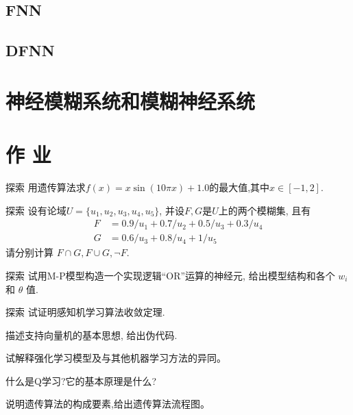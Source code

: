 {\subsection{FNN}
\subsection{DFNN}
\section{神经模糊系统和模糊神经系统}

\section{作      业}
\begin{custom}[explorecolor]{探索}
用遗传算法求$f(x)=x\sin(10πx)+1.0$的最大值,其中$x\in [-1,2]$.
\end{custom}
\begin{custom}[explorecolor]{探索}
设有论域$U=\{u_1, u_2, u_3, u_4, u_5\}$, 并设$F,G$是$U$上的两个模糊集, 且有
\begin{align*}
  F&=0.9/u_1+0.7/u_2+0.5/u_3+0.3/u_4\\
  G&=0.6/u_3+0.8/u_4+1/u_5
\end{align*}
请分别计算 $F\cap G, F\cup G,\neg F$.
\end{custom}
\begin{custom}[explorecolor]{探索}
试用M-P模型构造一个实现逻辑``OR''运算的神经元, 给出模型结构和各个 $w_{i} $ 和 $\theta $ 值.
\end{custom}
\begin{custom}[explorecolor]{探索}
试证明感知机学习算法收敛定理.
\end{custom}

\begin{think}
  描述支持向量机的基本思想, 给出伪代码.
\end{think}

\begin{think}
  试解释强化学习模型及与其他机器学习方法的异同。
\end{think}
\begin{think}
  什么是Q学习?它的基本原理是什么?
\end{think}
\begin{think}
  说明遗传算法的构成要素,给出遗传算法流程图。
\end{think}

}
